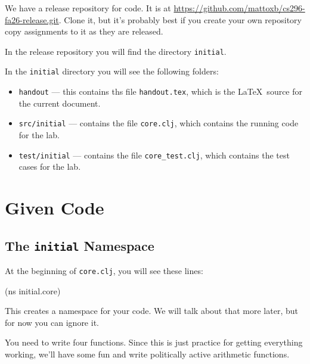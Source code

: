 \documentclass[12pt]{article}
\begin{document}
We have a release repository for code.  It is at \url{https://github.com/mattoxb/cs296-fa26-release.git}.
Clone it, but it's probably best if you create your own repository copy assignments to it as they are released.

In the release repository you will find the directory \texttt{initial}.

In the \texttt{initial} directory you will see the following folders:

\begin{itemize}
\item \texttt{handout} --- this contains ths file \texttt{handout.tex}, which is the \LaTeX\ source
  for the current document.
\item \texttt{src/initial} --- contains the file \texttt{core.clj}, which contains the
  running code for the lab.
\item \texttt{test/initial} --- contains the file \texttt{core\_test.clj}, which
  contains the test cases for the lab.
\end{itemize}

\section{Given Code}

\subsection{The \texttt{initial} Namespace}

At the beginning of \texttt{core.clj}, you will see these lines:

\begin{clojurecode}
(ns initial.core)
\end{clojurecode}

This creates a namespace for your code.  We will talk about that more later, but for now you can
ignore it.

You need to write four functions.  Since this is just practice for getting everything working, we'll
have some fun and write politically active arithmetic functions.
\end{document}

